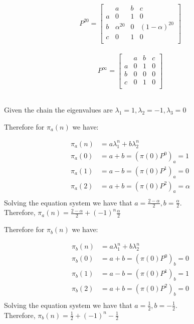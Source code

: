 \documentclass[12pt, a4paper]{article}
\begin{document}
\begin{align*}
  P^{20} = \begin{bmatrix}
       & a & b & c\\
     a & 0 & 1 & 0 \\
     b & \alpha^{20} & 0 & (1-\alpha)^{20} \\
     c & 0 & 1 & 0 \\
  \end{bmatrix}
\end{align*}


\begin{align*}
  P^{\infty} = \begin{bmatrix}
       & a & b & c\\
     a & 0 & 1 & 0 \\
     b & 0 & 0 & 0 \\
     c & 0 & 1 & 0 \\
  \end{bmatrix}
\end{align*}

\subsection{}
Given the chain the eigenvalues are $\lambda_1 = 1, \lambda_2 = -1, \lambda_3 = 0$

Therefore for $\pi_a(n)$ we have:

\begin{subequations}
  \begin{align}
    \pi_a(n) &= a \lambda_1^n + b \lambda_2^n \\
    \pi_a(0) &= a + b = (\pi(0)P^0)_a = 1\\
    \pi_a(1) &= a - b = (\pi(0)P^1)_a = 0\\
    \pi_a(2) &= a + b = (\pi(0)P^2)_a = \alpha\\
  \end{align}
\end{subequations}
Solving the equation system we have that $a = \frac{2-\alpha}{2}, b = \frac{\alpha}{2}$.\\
Therefore, $\pi_a(n) = \frac{2-\alpha}{2} + (-1)^n \frac{\alpha}{2}$

Therefore for $\pi_b(n)$ we have:

\begin{subequations}
  \begin{align}
    \pi_b(n) &= a \lambda_1^n + b \lambda_2^n \\
    \pi_b(0) &= a + b = (\pi(0)P^0)_b = 0\\
    \pi_b(1) &= a - b = (\pi(0)P^1)_b = 1\\
    \pi_b(2) &= a + b = (\pi(0)P^2)_b = 0\\
  \end{align}
\end{subequations}
Solving the equation system we have that $a = \frac{1}{2}, b = -\frac{1}{2}$.\\
Therefore, $\pi_b(n) = \frac{1}{2} + (-1)^n -\frac{1}{2}$
\end{document}
